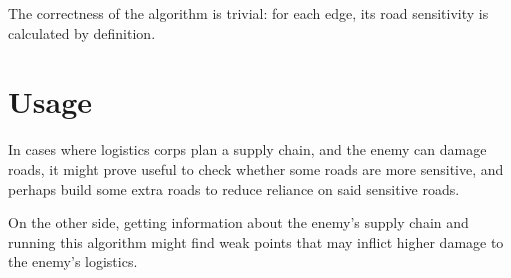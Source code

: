\documentclass{article}
\begin{document}
The correctness of the algorithm is trivial: for each edge, its road sensitivity is calculated by definition.

\section{Usage}

In cases where logistics corps plan a supply chain, and the enemy can damage roads, it might prove useful to check whether some roads are more sensitive, and perhaps build some extra roads to reduce reliance on said sensitive roads.

On the other side, getting information about the enemy's supply chain and running this algorithm might find weak points that may inflict higher damage to the enemy's logistics.
\end{document}
